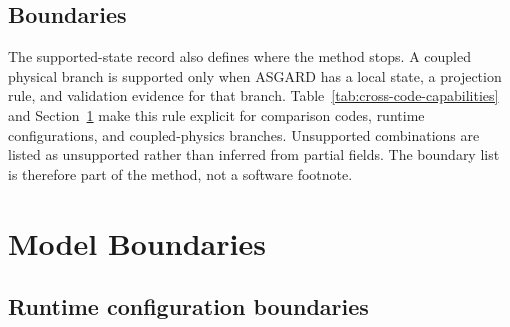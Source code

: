 \documentclass[twocolumn]{aastex702}
\begin{document}
\subsection{Boundaries}

The supported-state record also defines where the method stops.  A coupled
physical branch is supported only when ASGARD has a local state, a projection
rule, and validation evidence for that branch.  Table~\ref{tab:cross-code-capabilities}
and Section~\ref{sec:limits} make this rule explicit for comparison codes,
runtime configurations, and coupled-physics branches.  Unsupported combinations
are listed as unsupported rather than inferred from partial fields.  The boundary
list is therefore part of the method, not a software footnote.

\section{Model Boundaries} \label{sec:limits}

\subsection{Runtime configuration boundaries}
\end{document}
